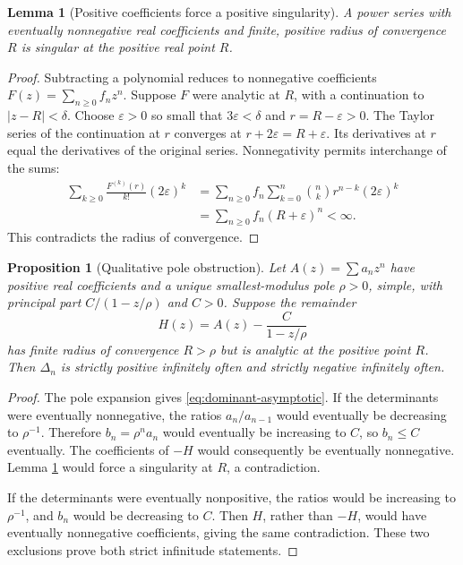 \documentclass[11pt,letterpaper]{article}
\newtheorem{proposition}[theorem]{Proposition}
\newtheorem{lemma}[theorem]{Lemma}
\theoremstyle{definition}
\newcommand{\Delt}{\Delta}
\numberwithin{equation}{section}
\begin{document}
\begin{lemma}[Positive coefficients force a positive singularity]
\label{lem:pringsheim}
A power series with eventually nonnegative real coefficients and finite,
positive radius of convergence $R$ is singular at the positive real point $R$.
\end{lemma}
\begin{proof}
Subtracting a polynomial reduces to nonnegative coefficients
$F(z)=\sum_{n\ge0}f_nz^n$. Suppose $F$ were analytic at $R$, with a
continuation to $|z-R|<\delta$. Choose $\varepsilon>0$ so small that
$3\varepsilon<\delta$ and $r=R-\varepsilon>0$.
The Taylor series of the continuation at $r$ converges at
$r+2\varepsilon=R+\varepsilon$. Its derivatives at $r$ equal the derivatives
of the original series. Nonnegativity permits interchange of the sums:
\begin{align*}
\sum_{k\ge0}\frac{F^{(k)}(r)}{k!}(2\varepsilon)^k
&=\sum_{n\ge0}f_n\sum_{k=0}^n\binom nk r^{n-k}(2\varepsilon)^k\\
&=\sum_{n\ge0}f_n(R+\varepsilon)^n<\infty.
\end{align*}
This contradicts the radius of convergence.
\end{proof}

\begin{proposition}[Qualitative pole obstruction]\label{prop:qualitative}
Let $A(z)=\sum a_nz^n$ have positive real coefficients and a unique
smallest-modulus pole $\rho>0$, simple, with principal part
$C/(1-z/\rho)$ and $C>0$. Suppose the remainder
\begin{equation}\label{eq:H}
H(z)=A(z)-\frac{C}{1-z/\rho}
\end{equation}
has finite radius of convergence $R>\rho$ but is analytic at the positive
point $R$. Then $\Delt_n$ is strictly positive infinitely often and strictly
negative infinitely often.
\end{proposition}
\begin{proof}
The pole expansion gives \eqref{eq:dominant-asymptotic}. If the determinants
were eventually nonnegative, the ratios $a_n/a_{n-1}$ would eventually
be decreasing to $\rho^{-1}$. Therefore $b_n=\rho^na_n$ would eventually
be increasing to $C$, so $b_n\le C$ eventually. The coefficients of
$-H$ would consequently be eventually nonnegative. Lemma
\ref{lem:pringsheim} would force a singularity at $R$, a contradiction.

If the determinants were eventually nonpositive, the ratios would be
increasing to $\rho^{-1}$, and $b_n$ would be decreasing to $C$.
Then $H$, rather than $-H$, would have eventually nonnegative coefficients,
giving the same contradiction. These two exclusions prove both strict
infinitude statements.
\end{proof}
\end{document}
